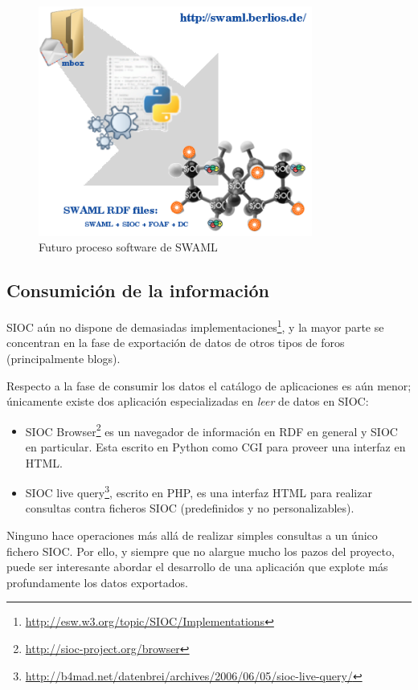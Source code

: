 \begin{figure}[H]
	\centering
	\includegraphics[width=9cm]{images/swaml-process.png}
	\caption{Futuro proceso software de SWAML}
	\label{fig:swamlProcess}
\end{figure}


\subsection{Consumición de la información}

SIOC aún no dispone de demasiadas implementaciones\footnote{\url{http://esw.w3.org/topic/SIOC/Implementations}},
y la mayor parte se concentran en la fase de exportación de datos de otros
tipos de foros (principalmente blogs). 

Respecto a la fase de consumir los datos el catálogo de aplicaciones es aún 
menor; únicamente existe dos aplicación especializadas en \emph{leer} de datos 
en SIOC:

\begin{itemize}
  \item SIOC Browser\footnote{\url{http://sioc-project.org/browser}} es un 
	navegador de información en RDF en general y SIOC en particular. 
	Esta escrito en Python como CGI para proveer una interfaz en HTML.
  \item SIOC live query\footnote{\url{http://b4mad.net/datenbrei/archives/2006/06/05/sioc-live-query/}},
	escrito en PHP, es una interfaz HTML para realizar consultas
	contra ficheros SIOC (predefinidos y no personalizables).
\end{itemize}

Ninguno hace operaciones más allá de realizar simples consultas a un único fichero 
SIOC. Por ello, y siempre que no alargue mucho los pazos del proyecto, puede ser 
interesante abordar el desarrollo de una aplicación que explote más profundamente
los datos exportados.
